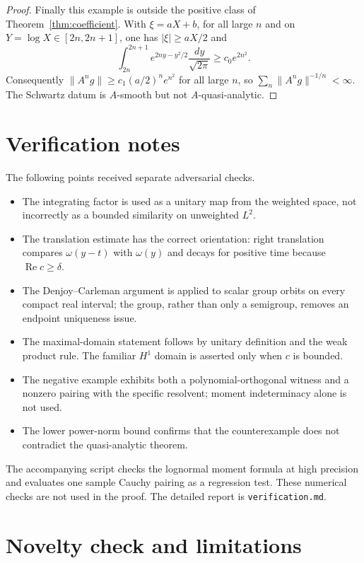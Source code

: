 \documentclass[11pt]{article}
\begin{document}
\begin{proof}
Finally this example is outside the positive class of
Theorem~\ref{thm:coefficient}.  With $\xi=aX+b$, for all large $n$ and on
$Y=\log X\in[2n,2n+1]$, one has $|\xi|\geq aX/2$ and
\[
 \int_{2n}^{2n+1}e^{2ny-y^2/2}\frac{dy}{\sqrt{2\pi}}
 \geq c_0e^{2n^2}.
\]
Consequently
$\|A^ng\|\geq c_1(a/2)^ne^{n^2}$ for all large $n$, so
$\sum_n\|A^ng\|^{-1/n}<\infty$.  The Schwartz datum is $A$-smooth but not
$A$-quasi-analytic.
\end{proof}

\section*{Verification notes}

The following points received separate adversarial checks.
\begin{itemize}
\item The integrating factor is used as a unitary map from the weighted
space, not incorrectly as a bounded similarity on unweighted $L^2$.
\item The translation estimate has the correct orientation: right
translation compares $\omega(y-t)$ with $\omega(y)$ and decays for positive
time because $\operatorname{Re}c\geq\delta$.
\item The Denjoy--Carleman argument is applied to scalar group orbits on every
compact real interval; the group, rather than only a semigroup, removes an
endpoint uniqueness issue.
\item The maximal-domain statement follows by unitary definition and the
weak product rule.  The familiar $H^1$ domain is asserted only when $c$ is
bounded.
\item The negative example exhibits both a polynomial-orthogonal witness and
a nonzero pairing with the specific resolvent; moment indeterminacy alone is
not used.
\item The lower power-norm bound confirms that the counterexample does not
contradict the quasi-analytic theorem.
\end{itemize}

The accompanying script checks the lognormal moment formula at high precision
and evaluates one sample Cauchy pairing as a regression test.  These numerical
checks are not used in the proof.  The detailed report is
\texttt{verification.md}.

\section*{Novelty check and limitations}
\end{document}
